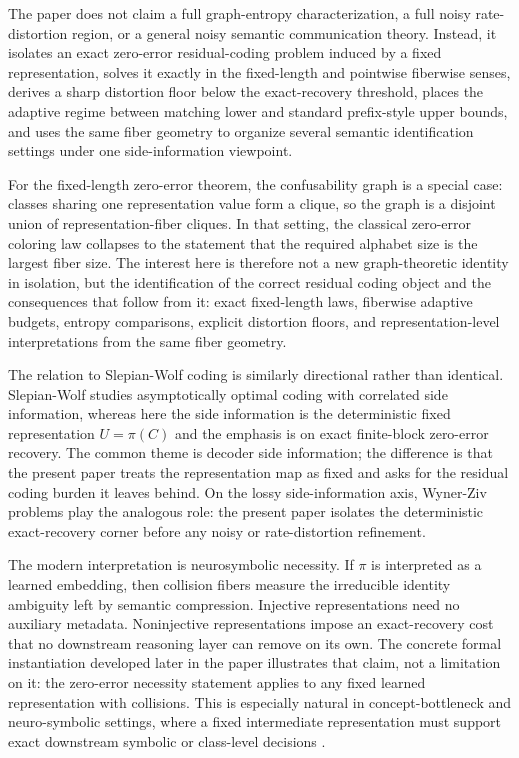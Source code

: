 The paper does not claim a full graph-entropy characterization, a full noisy rate-distortion region, or a general noisy semantic communication theory. Instead, it isolates an exact zero-error residual-coding problem induced by a fixed representation, solves it exactly in the fixed-length and pointwise fiberwise senses, derives a sharp distortion floor below the exact-recovery threshold, places the adaptive regime between matching lower and standard prefix-style upper bounds, and uses the same fiber geometry to organize several semantic identification settings under one side-information viewpoint.

For the fixed-length zero-error theorem, the confusability graph is a special case: classes sharing one representation value form a clique, so the graph is a disjoint union of representation-fiber cliques. In that setting, the classical zero-error coloring law collapses to the statement that the required alphabet size is the largest fiber size. The interest here is therefore not a new graph-theoretic identity in isolation, but the identification of the correct residual coding object and the consequences that follow from it: exact fixed-length laws, fiberwise adaptive budgets, entropy comparisons, explicit distortion floors, and representation-level interpretations from the same fiber geometry.

The relation to Slepian-Wolf coding is similarly directional rather than identical. Slepian-Wolf studies asymptotically optimal coding with correlated side information, whereas here the side information is the deterministic fixed representation $U=\pi(C)$ and the emphasis is on exact finite-block zero-error recovery. The common theme is decoder side information; the difference is that the present paper treats the representation map as fixed and asks for the residual coding burden it leaves behind. On the lossy side-information axis, Wyner-Ziv problems play the analogous role: the present paper isolates the deterministic exact-recovery corner before any noisy or rate-distortion refinement.

The modern interpretation is neurosymbolic necessity. If $\pi$ is interpreted as a learned embedding, then collision fibers measure the irreducible identity ambiguity left by semantic compression. Injective representations need no auxiliary metadata. Noninjective representations impose an exact-recovery cost that no downstream reasoning layer can remove on its own. The concrete formal instantiation developed later in the paper illustrates that claim, not a limitation on it: the zero-error necessity statement applies to any fixed learned representation with collisions. This is especially natural in concept-bottleneck and neuro-symbolic settings, where a fixed intermediate representation must support exact downstream symbolic or class-level decisions \cite{koh2020concept, garcez2020neurosymbolic}.


